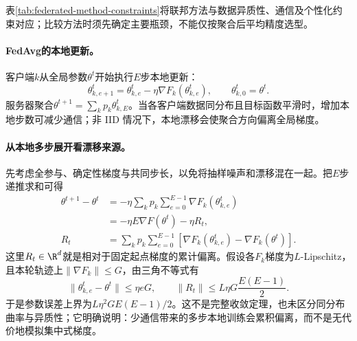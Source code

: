 \begin{table}[htbp]
\centering
\caption{联邦学习方法的约束匹配}
\label{tab:federated-method-constraints}
\scriptsize
\setlength{\tabcolsep}{3pt}
\end{table}

表\ref{tab:federated-method-constraints}将联邦方法与数据异质性、通信及个性化约束对应；比较方法时须先确定主要瓶颈，不能仅按聚合后平均精度选型。
\paragraph{FedAvg的本地更新。}
客户端$k$从全局参数$\theta^t$开始执行$E$步本地更新：
\begin{equation}
 \theta_{k,e+1}^{t}=\theta_{k,e}^{t}-\eta\nabla F_k(\theta_{k,e}^{t}),
 \qquad \theta_{k,0}^{t}=\theta^t.
\end{equation}
服务器聚合$\theta^{t+1}=\sum_kp_k\theta_{k,E}^t$。当各客户端数据同分布且目标函数平滑时，增加本地步数可减少通信；非 IID 情况下，本地漂移会使聚合方向偏离全局梯度。

\paragraph{从本地多步展开看漂移来源。}
先考虑全参与、确定性梯度与共同步长，以免将抽样噪声和漂移混在一起。把$E$步递推求和可得
\begin{align}
 \theta^{t+1}-\theta^t
 &=-\eta\sum_kp_k\sum_{e=0}^{E-1}\nabla F_k(\theta_{k,e}^t)\\
 &=-\eta E\nabla F(\theta^t)-\eta R_t,\\
 R_t&=\sum_kp_k\sum_{e=0}^{E-1}
 [\nabla F_k(\theta_{k,e}^t)-\nabla F_k(\theta^t)].
\end{align}
这里$R_t\in\R^d$就是相对于固定起点梯度的累计偏离。假设各$F_k$梯度为$L$-Lipschitz，且本轮轨迹上$\|\nabla F_k\|\leq G$，由三角不等式有
\begin{equation}
 \|\theta_{k,e}^t-\theta^t\|\leq\eta eG,
 \qquad \|R_t\|\leq L\eta G\frac{E(E-1)}2.
\end{equation}
于是参数误差上界为$L\eta^2GE(E-1)/2$。这不是完整收敛定理，也未区分同分布曲率与异质性；它明确说明：少通信带来的多步本地训练会累积偏离，而不是无代价地模拟集中式梯度。

